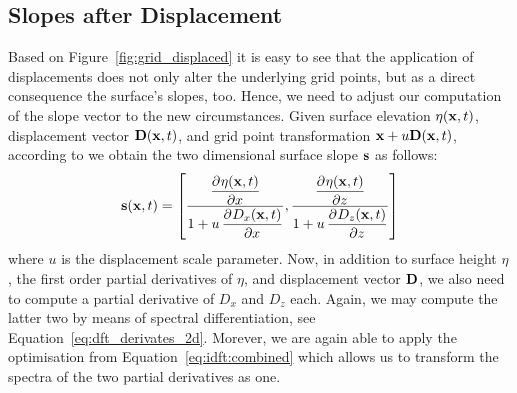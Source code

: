 \subsection{Slopes after Displacement}
%
Based on Figure~\ref{fig:grid_displaced} it is easy to see that the application 
of displacements does not only alter the underlying grid points, but as a 
direct consequence the surface's slopes, too. Hence, we need to adjust our 
computation of the slope vector to the new circumstances. Given surface 
elevation $\eta(\mathbf{x},t)$, displacement vector $\mathbf{D}(\mathbf{x},t)$,
and grid point transformation $\mathbf{x} + u\mathbf{D}(\mathbf{x},t)$,
according to \citet[private communication]{article:whitecaps} we obtain the
two dimensional surface slope $\mathbf{s}$ as follows:
\begin{equation}
\mvec{s}(\mvec{x},t) = \left[\frac{\dpd{\eta(\mvec{x},t)}{x}}{1 + u 
\dpd{D_x(\mvec{x},t)}{x}}, \frac{\dpd{\eta(\mvec{x},t)}{z}}{1 + u 
\dpd{D_z(\mvec{x},t)}{z}}\right]
\end{equation}
where $u$ is the displacement scale parameter. Now, in addition
to surface height $\eta$, the first order partial derivatives of $\eta$, and
displacement vector $\mathbf{D}$, we also need to compute a partial derivative of
$D_x$ and $D_z$ each. Again, we may compute the latter two by means of spectral
differentiation, see Equation~\ref{eq:dft_derivates_2d}. Morever, we are again
able to apply the optimisation from Equation~\ref{eq:idft:combined} which allows
us to transform the spectra of the two partial derivatives as one.
%
